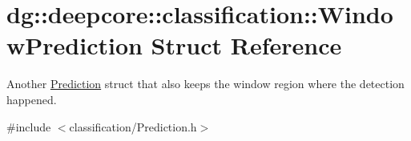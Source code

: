 \hypertarget{structdg_1_1deepcore_1_1classification_1_1_window_prediction}{}\section{dg\+:\+:deepcore\+:\+:classification\+:\+:Window\+Prediction Struct Reference}
\label{structdg_1_1deepcore_1_1classification_1_1_window_prediction}


Another \hyperlink{structdg_1_1deepcore_1_1classification_1_1_prediction}{Prediction} struct that also keeps the window region where the detection happened.  




{\ttfamily \#include $<$classification/\+Prediction.\+h$>$}

